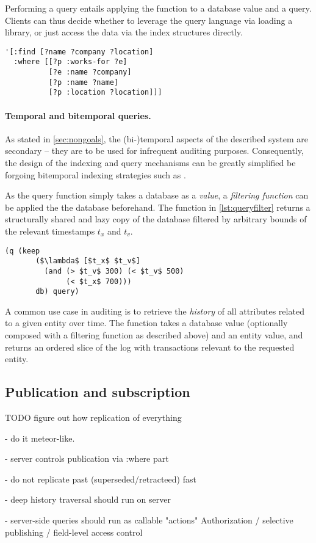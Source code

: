 Performing a query entails applying the  function to a database value and a query. Clients can thus decide whether to leverage the query language via loading a library, or just access the data via the index structures directly.

\begin{lstlisting}[label={lst:example_query},caption=Example edn Datalog query]
'[:find [?name ?company ?location]
  :where [[?p :works-for ?e]
          [?e :name ?company]
          [?p :name ?name]
          [?p :location ?location]]]
\end{lstlisting}

\paragraph{Temporal and bitemporal queries.}
As stated in \autoref{sec:nongoals}, the (bi-)temporal aspects of the described system are secondary -- they are to be used for infrequent auditing purposes. Consequently, the design of the indexing and query mechanisms can be greatly simplified be forgoing bitemporal indexing strategies such as \cite{nascimento1995ivtt}.

As the query function simply takes a database as a \emph{value}, a \emph{filtering function} can be applied the the database beforehand. The  function in \autoref{lst:queryfilter} returns a structurally shared and lazy copy of the database filtered by arbitrary bounds of the relevant timestamps $t_x$ and $t_v$.

\begin{lstlisting}[label={lst:queryfilter},caption=Applying a temporal filter before querying,morekeywords={keep,q,<,>}]
  (q (keep
       ($\lambda$ [$t_x$ $t_v$]
         (and (> $t_v$ 300) (< $t_v$ 500)
              (< $t_x$ 700)))
       db) query)
  \end{lstlisting}


A common use case in auditing is to retrieve the \emph{history} of all attributes related to a given entity over time. The  function takes a database value (optionally composed with a filtering function as described above) and an entity value, and returns an ordered slice of the log with transactions relevant to the requested entity.



\subsection{Publication and subscription}

TODO figure out how replication of everything

- do it meteor-like.

- server controls publication via :where part

- do not replicate past (superseded/retracteed) fast

- deep history traversal should run on server

- server-side queries should run as callable "actions"
Authorization / selective publishing / field-level access control
